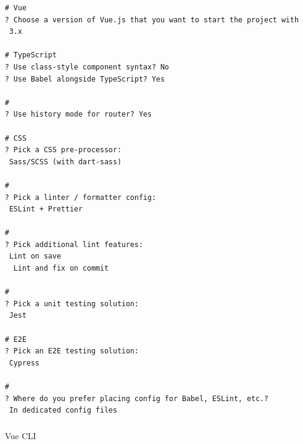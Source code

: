 \begin{lstlisting}[style=terminal]
# Vue
? Choose a version of Vue.js that you want to start the project with 
 3.x

# TypeScript
? Use class-style component syntax? No
? Use Babel alongside TypeScript? Yes

# 
? Use history mode for router? Yes

# CSS
? Pick a CSS pre-processor:
 Sass/SCSS (with dart-sass)

# 
? Pick a linter / formatter config:
 ESLint + Prettier

# 
? Pick additional lint features:
 Lint on save
  Lint and fix on commit

# 
? Pick a unit testing solution:
 Jest

# E2E
? Pick an E2E testing solution:
 Cypress

# 
? Where do you prefer placing config for Babel, ESLint, etc.?
 In dedicated config files
\end{lstlisting}

\hypertarget{section-36}{%
\subsubsection{}\label{section-36}}

Vue CLI

